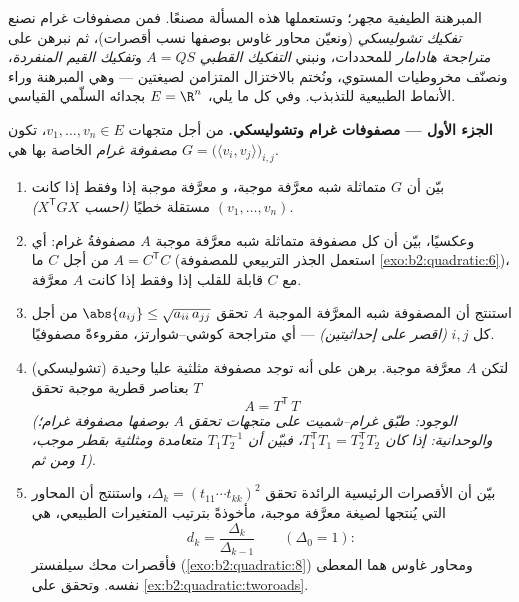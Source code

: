 \begin{problem}\label{pb:b2:quadratic:1}
المبرهنة الطيفية مجهر؛ وتستعملها هذه المسألة مصنعًا.
فمن مصفوفات غرام نصنع \emph{تفكيك
تشوليسكي} (ونعيّن محاور
غاوس بوصفها نسب أقصرات)، ثم نبرهن على \emph{متراجحة
هادامار} للمحددات، ونبني
\emph{التفكيك القطبي} $A =
QS$ و\emph{تفكيك القيم المنفردة}، ونصنّف مخروطيات
المستوي، ونُختم بالاختزال المتزامن لصيغتين ---
وهي المبرهنة وراء الأنماط الطبيعية للتذبذب. وفي كل ما يلي، $E =
\R^n$ بجدائه السلّمي القياسي.

\medskip
\noindent\textbf{الجزء الأول --- مصفوفات غرام وتشوليسكي.} من أجل
متجهات $v_1, \dots, v_n \in E$، تكون \emph{مصفوفة غرام} الخاصة بها هي
$G = \bigl(\langle v_i, v_j\rangle\bigr)_{i,j}$.
\begin{enumerate}
  \item بيّن أن $G$ متماثلة شبه معرَّفة موجبة، و
        معرَّفة موجبة إذا وفقط إذا كانت $(v_1, \dots, v_n)$
        مستقلة خطيًا \emph{(احسب $X^{\mathsf T}GX$)}.
  \item وعكسيًا، بيّن أن كل مصفوفة متماثلة شبه معرَّفة
        موجبة $A$ مصفوفةُ غرام: أي $A = C^{\mathsf T}C$
        من أجل $C$ ما (استعمل الجذر التربيعي للمصفوفة
        \cref{exo:b2:quadratic:6})، مع $C$ قابلة للقلب إذا وفقط إذا كانت $A$
        معرَّفة.
  \item استنتج أن المصفوفة شبه المعرَّفة الموجبة $A$ تحقق
        $\abs{a_{ij}} \leq \sqrt{a_{ii}\,a_{jj}}$ من أجل كل $i,
        j$ \emph{(اقصر على إحداثيتين)} --- أي
        متراجحة كوشي--شوارتز، مقروءةً مصفوفيًا.
  \item (تشوليسكي) لتكن $A$ معرَّفة موجبة. برهن على أنه
        توجد مصفوفة مثلثية عليا \emph{وحيدة} $T$ بعناصر
        قطرية موجبة تحقق
        \[
        A = T^{\mathsf T}\,T
        \]
        \emph{(الوجود: طبّق غرام--شميت على متجهات
        تحقق $A$ بوصفها مصفوفة غرام؛ والوحدانية: إذا كان
        $T_1^{\mathsf T}T_1 = T_2^{\mathsf T}T_2$، فبيّن أن
        $T_1T_2^{-1}$ متعامدة ومثلثية بقطر
        موجب، ومن ثم $I$)}.
  \item بيّن أن الأقصرات الرئيسية الرائدة تحقق
        $\Delta_k = (t_{11}\cdots t_{kk})^2$، واستنتج أن
        المحاور التي يُنتجها  لصيغة
        معرَّفة موجبة، مأخوذةً بترتيب المتغيرات الطبيعي،
        هي
        \[
        d_k = \frac{\Delta_k}{\Delta_{k-1}}
        \qquad (\Delta_0 = 1) :
        \]
        فأقصرات محك سيلفستر
        (\cref{exo:b2:quadratic:8}) ومحاور غاوس هما
        المعطى نفسه. وتحقق على
        \cref{ex:b2:quadratic:tworoads}.
\end{enumerate}


\end{problem}
